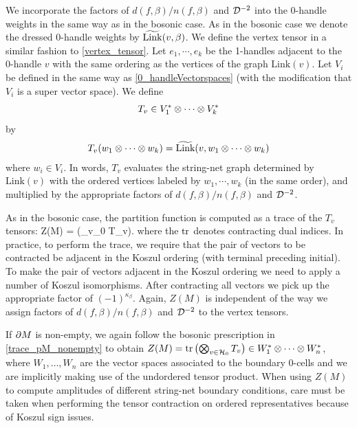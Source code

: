 We incorporate the factors of $d(f, \beta)/n(f,\beta)$ and $\mathcal{D}^{-2}$ into the 0-handle 
weights 
in the same way as in the bosonic case. 
As in the bosonic case we denote the dressed 0-handle weights by $\widetilde{\rm Link}(v,\beta)$.
We define the vertex tensor in a similar fashion to \eqref{vertex_tensor}. 
Let $e_1, \cdots, e_k$ be the 1-handles adjacent to the 0-handle $v$ with the same ordering as the vertices of the graph $\text{Link}(v)$.
Let $V_i$ be defined in the same way as \eqref{0_handleVectorspaces} (with the modification that $V_i$ is a super vector space).
We define 
\begin{align} \label{Tv_defn}
T_v  \in V_1^* \otimes \cdots \otimes V_k^*
\end{align}
by 
\begin{align}
T_v(w_1 \otimes \cdots \otimes w_k) = \widetilde{\text{Link}}(v, w_1 \otimes \cdots \otimes w_k)
\end{align} 
where $w_i \in V_i$.
In words, $T_v$ evaluates the string-net graph determined by $\text{Link}(v)$ with the ordered vertices labeled by $w_1, \cdots, w_k$ (in the same order), and multiplied by the appropriate factors of $d(f,\beta)/n(f,\beta)$ and $\mathcal{D}^{-2}$.

As in the bosonic case, the partition function 
is computed as a trace of the $T_v$ tensors:
\be \label{fermion_Z_as_tr} Z(M) = \tr \left(\bigotimes_{v\in \mch_0} T_v\right).\ee
where the $\text{tr}$ denotes contracting dual indices.
In practice, to perform the trace, we require that the pair of vectors to be contracted be adjacent in the Koszul ordering (with terminal preceding initial). 
To make the pair of vectors adjacent in the Koszul ordering we need to apply a number of Koszul isomorphisms. 
After contracting all vectors we pick up the appropriate factor of $(-1)^{\kappa_\beta}$. 
Again, $Z(M)$
is independent of the way we assign factors of $d(f,\beta)/n(f,\beta)$ and $\mathcal{D}^{-2}$ to the 
vertex tensors. 

If $\partial M$ is non-empty, we again follow the bosonic prescription in \eqref{trace_pM_nonempty} 
to obtain $Z(M) = \text{tr} \left( \bigotimes_{v\in \mathcal{H}_0} T_v \right) \in W_1^*\otimes\cdots\otimes W_n^*$, where 
$W_1, \ldots, W_n$ are the vector spaces associated to the boundary 0-cells and we 
are implicitly making use of the undordered tensor product. When using $Z(M)$ to compute 
amplitudes of different string-net boundary conditions, care must be taken when performing the 
tensor contraction on ordered representatives because of Koszul sign issues. 



